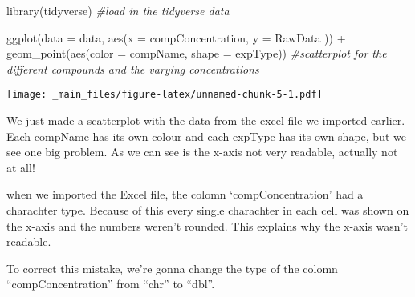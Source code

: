 \documentclass[
]{book}
\newenvironment{Shaded}{\begin{snugshade}}{\end{snugshade}}
\newcommand{\AttributeTok}[1]{\textcolor[rgb]{0.77,0.63,0.00}{#1}}
\newcommand{\CommentTok}[1]{\textcolor[rgb]{0.56,0.35,0.01}{\textit{#1}}}
\newcommand{\DecValTok}[1]{\textcolor[rgb]{0.00,0.00,0.81}{#1}}
\newcommand{\FloatTok}[1]{\textcolor[rgb]{0.00,0.00,0.81}{#1}}
\newcommand{\FunctionTok}[1]{\textcolor[rgb]{0.00,0.00,0.00}{#1}}
\newcommand{\NormalTok}[1]{#1}
\newcommand{\OtherTok}[1]{\textcolor[rgb]{0.56,0.35,0.01}{#1}}
\newcommand{\SpecialCharTok}[1]{\textcolor[rgb]{0.00,0.00,0.00}{#1}}
\newcommand{\StringTok}[1]{\textcolor[rgb]{0.31,0.60,0.02}{#1}}
\begin{document}
\begin{Shaded}
\begin{Highlighting}[]
\FunctionTok{library}\NormalTok{(tidyverse) }\CommentTok{\#load in the tidyverse data}

\FunctionTok{ggplot}\NormalTok{(}\AttributeTok{data =}\NormalTok{ data, }\FunctionTok{aes}\NormalTok{(}\AttributeTok{x =}\NormalTok{ compConcentration, }\AttributeTok{y =}\NormalTok{ RawData )) }\SpecialCharTok{+}
  \FunctionTok{geom\_point}\NormalTok{(}\FunctionTok{aes}\NormalTok{(}\AttributeTok{color =}\NormalTok{ compName, }
                 \AttributeTok{shape =}\NormalTok{ expType)) }\CommentTok{\#scatterplot for the different compounds and the varying concentrations}
\end{Highlighting}
\end{Shaded}

\texttt{[image: \_main\_files/figure-latex/unnamed-chunk-5-1.pdf]}

We just made a scatterplot with the data from the excel file we imported earlier. Each compName has its own colour and each expType has its own shape, but we see one big problem. As we can see is the x-axis not very readable, actually not at all!

when we imported the Excel file, the colomn `compConcentration' had a charachter type. Because of this every single charachter in each cell was shown on the x-axis and the numbers weren't rounded. This explains why the x-axis wasn't readable.

To correct this mistake, we're gonna change the type of the colomn ``compConcentration'' from ``chr'' to ``dbl''.

\begin{Shaded}
\end{Shaded}
\end{document}
